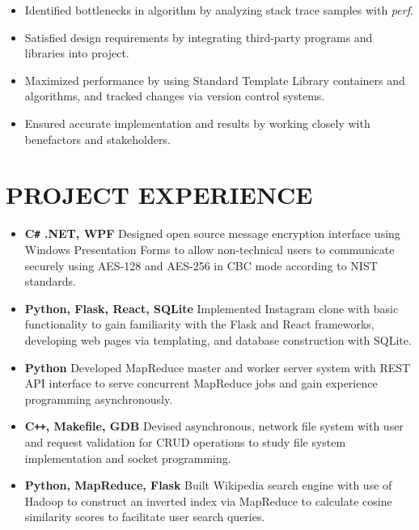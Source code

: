 \documentclass[overlapped]{res}
\begin{document}
\begin{resume}
\begin{itemize}
    \item Identified bottlenecks in algorithm by analyzing stack trace samples with \textit{perf}.
    
    \item Satisfied design requirements by integrating third-party programs 
    and libraries into project.
    
    \item Maximized performance by using 
    Standard Template Library containers and algorithms,
    and tracked changes via version control systems.

    \item Ensured accurate implementation and results by working closely
     with benefactors and stakeholders.
\end{itemize}

\section{PROJECT EXPERIENCE}

\begin{itemize}  \itemsep -2pt %
    \item \textbf{C\texttt{\#} .NET, WPF}
    Designed open source message encryption interface using
    Windows Presentation Forms to allow non-technical users
    to communicate securely using AES-128 and AES-256 in CBC mode
    according to NIST standards.
    \item \textbf{Python, Flask, React, SQLite}
    Implemented Instagram clone with basic functionality 
    to gain familiarity with the Flask and React frameworks, 
    developing web pages via templating, 
    and database construction with SQLite.
    \item \textbf{Python}
    Developed MapReduce master and worker server system 
    with REST API interface to serve concurrent MapReduce jobs
    and gain experience programming asynchronously.
    \item \textbf{C\texttt{++}, Makefile, GDB} Devised asynchronous, network file system with user and request
    validation for CRUD operations to study file system implementation
    and socket programming.
    \item \textbf{Python, MapReduce, Flask}
    Built Wikipedia search engine with use of Hadoop 
    to construct an inverted index via MapReduce
    to calculate cosine similarity scores 
    to facilitate user search queries.


\end{itemize}
\end{resume}
\end{document}
